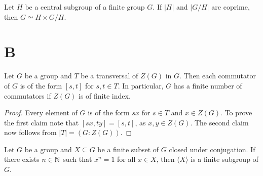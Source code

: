 \begin{exercise}
	Let $H$ be a central subgroup of a finite group $G$. If $|H|$
	and $|G/H|$ are coprime, then $G\simeq H\times G/H$.
\end{exercise}



\section*{B}

\begin{lemma}
	\label{lemma:[s,t]} 
	Let $G$ be a group and $T$ be a transversal of $Z(G)$ in
	$G$. Then each commutator of $G$ is of the form $[s,t]$ for $s,t\in T$. In particular, 
	$G$ has a finite number of commutators if $Z(G)$ is of finite index. 
\end{lemma}

\begin{proof}
	Every element of $G$ is of the form $sx$ for $s\in T$ and $x\in
	Z(G)$. To prove the first claim note that 
	$[sx,ty]=[s,t]$, 
	as $x,y\in Z(G)$. The second claim now follows from	$|T|=(G:Z(G))$.
\end{proof}

\begin{theorem}[Dietzmann]
	\label{theorem:Dietzmann} 
	Let $G$ be a group and $X\subseteq G$ be a finite subset of 
	$G$ closed under conjugation. If there exists $n\in\mathbb{N}$ such that 
	$x^n=1$ for all $x\in X$, then $\langle X\rangle$ is a finite subgroup of 
	$G$.
\end{theorem}

